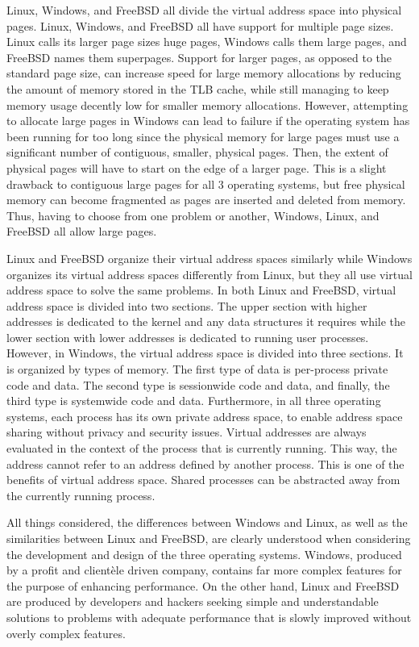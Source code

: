\documentclass[letterpaper,10pt,draftclsnofoot,onecolumn,]{IEEEtran}
\begin{document}
Linux, Windows, and FreeBSD all divide the virtual address space into physical pages. Linux, Windows, and FreeBSD all have support for multiple page sizes. Linux calls its larger page sizes huge pages, Windows calls them large pages, and FreeBSD names them superpages. Support for larger pages, as opposed to the standard page size, can increase speed for large memory allocations by reducing the amount of memory stored in the TLB cache, while still managing to keep memory usage decently low for smaller memory allocations. However, attempting to allocate large pages in Windows can lead to failure if the operating system has been running for too long since the physical memory for large pages must use a significant number of contiguous, smaller, physical pages. Then, the extent of physical pages will have to start on the edge of a larger page. This is a slight drawback to contiguous large pages for all 3 operating systems, but free physical memory can become fragmented as pages are inserted and deleted from memory. Thus, having to choose from one problem or another, Windows, Linux, and FreeBSD all allow large pages.

Linux and FreeBSD organize their virtual address spaces similarly while Windows organizes its virtual address spaces differently from Linux, but they all use virtual address space to solve the same problems. In both Linux and FreeBSD, virtual address space is divided into two sections. The upper section with higher addresses is dedicated to the kernel and any data structures it requires while the lower section with lower addresses is dedicated to running user processes. However, in Windows, the virtual address space is divided into three sections. It is organized by types of memory. The first type of data is per-process private code and data. The second type is sessionwide code and data, and finally, the third type is systemwide code and data. Furthermore, in all three operating systems, each process has its own private address space, to enable address space sharing without privacy and security issues. Virtual addresses are always evaluated in the context of the process that is currently running. This way, the address cannot refer to an address defined by another process. This is one of the benefits of virtual address space. Shared processes can be abstracted away from the currently running process.

All things considered, the differences between Windows and Linux, as well as the similarities between Linux and FreeBSD, are clearly understood when considering the development and design of the three operating systems. Windows, produced by a profit and clientèle driven company, contains far more complex features for the purpose of enhancing performance. On the other hand, Linux and FreeBSD are produced by developers and hackers seeking simple and understandable solutions to problems with adequate performance that is slowly improved without overly complex features.
\end{document}
